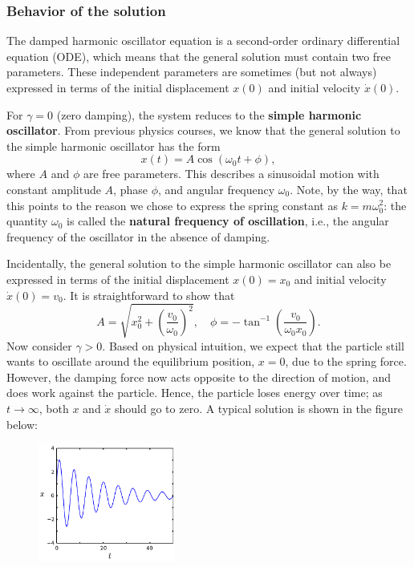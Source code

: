 \documentclass[10pt,a4paper]{article}
\begin{document}
\subsubsection{Behavior of the solution}
\label{behavior-of-the-solution}

The damped harmonic oscillator equation is a second-order ordinary
differential equation (ODE), which means that the general solution
must contain two free parameters.  These independent parameters are
sometimes (but not always) expressed in terms of the initial
displacement $x(0)$ and initial velocity $\dot{x}(0)$.

For $\gamma = 0$ (zero damping), the system reduces to the
\textbf{simple harmonic oscillator}. From previous physics courses, we
know that the general solution to the simple harmonic oscillator has the
form
\begin{equation}
x(t) = A \cos(\omega_0 t + \phi),
\end{equation}
where $A$ and $\phi$ are free parameters. This describes a
sinusoidal motion with constant amplitude $A$, phase $\phi$, and
angular frequency $\omega_0$. Note, by the way, that this points to
the reason we chose to express the spring constant as
$k = m\omega_0^2$: the quantity $\omega_0$ is called the
\textbf{natural frequency of oscillation}, i.e., the angular frequency
of the oscillator in the absence of damping.

Incidentally, the general solution to the simple harmonic oscillator can
also be expressed in terms of the initial displacement $x(0) = x_0$
and initial velocity $\dot{x}(0) = v_0$. It is straightforward to show
that
\begin{equation}
A = \sqrt{x_0^2 + \left(\frac{v_0}{\omega_0}\right)^2}, \quad \phi = -\tan^{-1}\left(\frac{v_0}{\omega_0 x_0}\right).
\end{equation}
Now consider $\gamma > 0$. Based on physical intuition, we expect that
the particle still wants to oscillate around the equilibrium position,
$x = 0$, due to the spring force. However, the damping force now acts
opposite to the direction of motion, and does work against the
particle.  Hence, the particle loses energy over time; as $t
\rightarrow \infty$, both $x$ and $\dot{x}$ should go to zero.  A
typical solution is shown in the figure below:

\begin{figure}[h]
  \centering\includegraphics[width=0.4\textwidth]{damped_oscillator_motion}
\end{figure}
            
\end{document}
